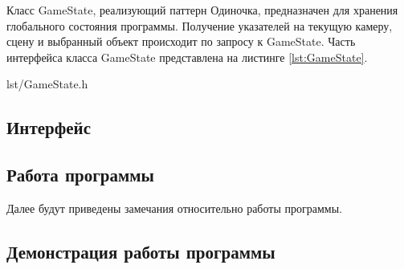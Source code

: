 Класс GameState, реализующий паттерн Одиночка, предназначен для хранения глобального состояния программы.
Получение указателей на текущую камеру, сцену и выбранный объект происходит по запросу к GameState.
Часть интерфейса класса GameState представлена на листинге \ref{lst:GameState}.

\begin{code}
    \begin{lstinputlisting}[
            label={lst:GameState},
            caption={Класс GameState},
        ]{lst/GameState.h}
    \end{lstinputlisting}
\end{code}

\subsection{Интерфейс}

\subsection{Работа программы}

Далее будут приведены замечания относительно работы программы.


\subsection{Демонстрация работы программы}
